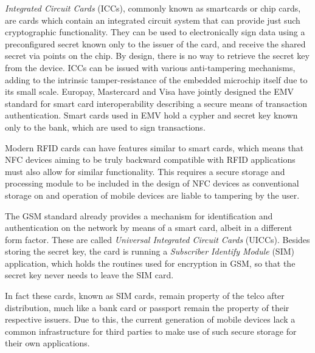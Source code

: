 
\textit{Integrated Circuit Cards} (ICCs), commonly known as smartcards or chip cards, are cards which contain an integrated circuit system that can provide just such cryptographic functionality.
They can be used to electronically sign data using a preconfigured secret known only to the issuer of the card, and receive the shared secret via points on the chip.
By design, there is no way to retrieve the secret key from the device.
ICCs can be issued with various anti-tampering mechanisms, adding to the intrinsic tamper-resistance of the embedded microchip itself due to its small scale. \cite{kömmerling1999design}
Europay, Mastercard and Visa have jointly designed the EMV standard for smart card interoperability describing a secure means of transaction authentication. %
Smart cards used in EMV hold a cypher and secret key known only to the bank, which are used to sign transactions.

Modern RFID cards can have features similar to smart cards, which means that NFC devices aiming to be truly backward compatible with RFID applications must also allow for similar functionality.
This requires a secure storage and processing module to be included in the design of NFC devices as conventional storage on and operation of mobile devices are liable to tampering by the user.

The GSM standard already provides a mechanism for identification and authentication on the network by means of a smart card, albeit in a different form factor.
These are called \textit{Universal Integrated Circuit Cards} (UICCs).
Besides storing the secret key, the card is running a \textit{Subscriber Identify Module} (SIM) application, which holds the routines used for encryption in GSM, so that the secret key never needs to leave the SIM card. %

In fact these cards, known as SIM cards, remain property of the telco after distribution, much like a bank card or passport remain the property of their respective issuers. %
Due to this, the current generation of mobile devices lack a common infrastructure for third parties to make use of such secure storage for their own applications.

